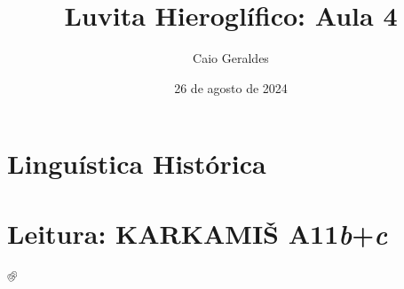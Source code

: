 \documentclass[a4paper,12pt,article]{memoir}
\title{Luvita Hieroglífico: Aula 4}
\author{Caio Geraldes}
\date{26 de agosto de 2024}
\begin{document}
\setlength{\Exlabelsep}{0.5em}
\setlength{\SubExleftmargin}{1.5em}

\frontmatter

\mainmatter%

\maketitle


\chapter{Linguística Histórica}


\chapter{Leitura: KARKAMIŠ A11\emph{b}+\emph{c}}


% 


\backmatter%

\printbibliography%

𔐀
\end{document}
